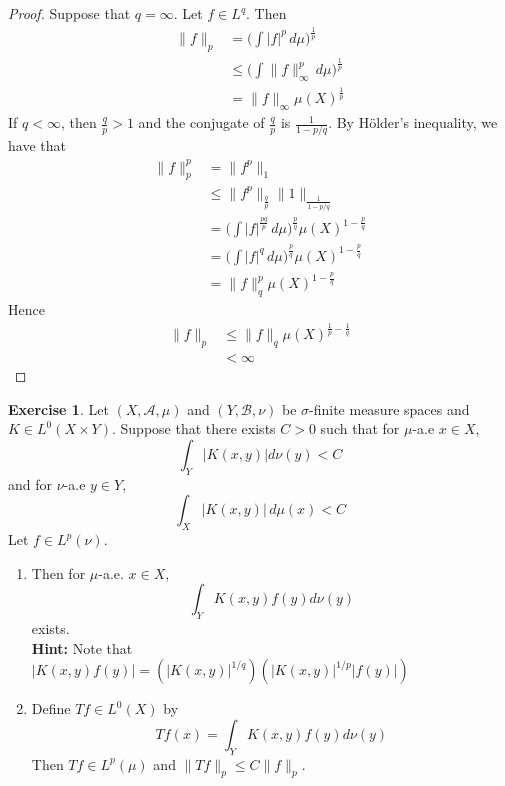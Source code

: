 \documentclass[12pt]{amsart}
\theoremstyle{definition}
\newtheorem{ex}[definition]{Exercise}
\newcommand{\sig}{\sigma}
\newcommand{\MA}{\mathcal{A}}
\newcommand{\MB}{\mathcal{B}}
\newcommand{\dmu}{\, d \mu}
\newcommand{\lex}[1]{\label{ex:#1}}
\begin{document}
	\begin{proof}
		Suppose that $q = \infty$. Let $f \in L^q$. Then
		\begin{align*}
			\|f \|_p 
			&= \bigg(\int | f |^p \dmu \bigg)^{\frac{1}{p}} \\
			& \leq \bigg(\int \| f \|_{\infty} ^p \dmu \bigg)^{\frac{1}{p}} \\
			&= \|f \|_{\infty} \mu(X)^{\frac{1}{p}}
		\end{align*} 
		If $q < \infty$, then $\frac{q}{p} > 1$ and the conjugate of $\frac{q}{p}$ is $\frac{1}{1- p/q}$. By Hölder's inequality, we have that 
		\begin{align*}
			\|f \|_p^p 
			&= \|f^p \|_1 \\
			&\leq \|f^p \|_{\frac{q}{p}} \|1 \|_{\frac{1}{1-p/q}} \\
			&= \bigg(\int |f|^{\frac{pq}{p}} \dmu \bigg)^{\frac{p}{q}} \mu(X)^{1-\frac{p}{q}} \\
			&= \bigg(\int |f|^{q} \dmu \bigg)^{\frac{p}{q}}\mu(X)^{1-\frac{p}{q}} \\
			&= \|f \|_q^p\mu(X)^{1-\frac{p}{q}}
		\end{align*}
		Hence 
		\begin{align*}
			\|f \|_p 
			&\leq \|f \|_q\mu(X)^{\frac{1}{p}-\frac{1}{q}} \\
			&< \infty
		\end{align*}
	\end{proof}
	
	\begin{ex} \lex{00000} 
	Let $(X, \MA, \mu)$ and $(Y, \MB, \nu)$ be $\sig$-finite measure spaces and $K\in L^0(X \times Y)$. Suppose that there exists $C > 0$ such that for $\mu$-a.e $x \in X$, $$\int_Y |K(x, y)| d \nu(y) < C$$ and for $\nu$-a.e $y \in Y$, $$\int_X |K(x, y)| \dmu(x) < C$$
	Let $f \in L^p(\nu)$.
	\begin{enumerate}
	\item Then for $\mu$-a.e. $x \in X$, $$\int_Y K(x,y) f(y) d \nu(y)$$ exists. \\
	\textbf{Hint:} Note that $|K(x, y) f(y)| = (|K(x,y)|^{1/q})(|K(x,y)|^{1/p}|f(y)|)$
	\item Define $Tf \in L^0(X)$ by $$Tf(x) = \int_Y K(x, y) f(y)d \nu(y)$$ Then $Tf \in L^p(\mu)$ and $\|Tf\|_p \leq C\|f\|_p$. 
	\end{enumerate}
	\end{ex}
	
\end{document}

